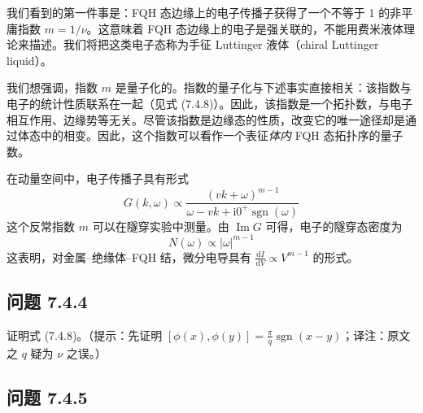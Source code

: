 我们看到的第一件事是：FQH 态边缘上的电子传播子获得了一个不等于 1 的非平庸指数 $m=1/\nu$。这意味着 FQH 态边缘上的电子是强关联的，不能用费米液体理论来描述。我们将把这类电子态称为手征 Luttinger 液体（chiral Luttinger liquid）。

我们想强调，指数 $m$ 是量子化的。指数的量子化与下述事实直接相关：该指数与电子的统计性质联系在一起（见式 (7.4.8)）。因此，该指数是一个拓扑数，与电子相互作用、边缘势等无关。尽管该指数是边缘态的性质，改变它的唯一途径却是通过体态中的相变。因此，这个指数可以看作一个表征\emph{体内} FQH 态拓扑序的量子数。

在动量空间中，电子传播子具有形式
\begin{equation*}
G(k,\omega)\propto\frac{(vk+\omega)^{m-1}}{\omega-vk+\mathrm{i}0^+\operatorname{sgn}(\omega)}
\end{equation*}
这个反常指数 $m$ 可以在隧穿实验中测量。由 $\operatorname{Im}G$ 可得，电子的隧穿态密度为
\begin{equation*}
N(\omega)\propto|\omega|^{m-1}
\end{equation*}
这表明，对金属--绝缘体--FQH 结，微分电导具有 $\frac{\mathrm{d}I}{\mathrm{d}V}\propto V^{m-1}$ 的形式。

\subsection*{问题 7.4.4}

证明式 (7.4.8)。（提示：先证明 $[\phi(x),\phi(y)]=\frac{\pi}{q}\operatorname{sgn}(x-y)$；译注：原文之 $q$ 疑为 $\nu$ 之误。）

\subsection*{问题 7.4.5}


